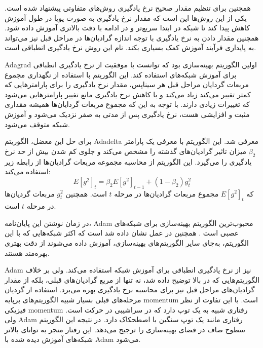 همچنین برای تنظیم مقدار صحیح نرخ یادگیری روش‌های متفاوتی پیشنهاد شده است. یکی از
این روش‌ها این است که مقدار نرخ یادگیری به صورت پویا در طول آموزش کاهش پیدا کند
تا شبکه در ابتدا سریع‌تر و در ادامه با دقت بالاتری آموزش داده شود. همچنین مقدار
دادن به نرخ یادگیری با توجه اندازه گرادیان‌ها در مراحل قبل نیز می‌تواند به
پایداری فرآیند آموزش کمک بسیاری بکند. نام این روش نرخ یادگیری انطباقی است.

Adagrad اولین الگوریتم بهینه‌سازی بود که توانست با موفقیت از نرخ یادگیری
انطباقی برای آموزش شبکه‌های استفاده کند. این الگوریتم با استفاده از نگهداری
مجموع مربعات گردایان مراحل قبل هر سیناپس، مقدار نرخ یادگیری را برای پارامترهایی
که کمتر تغییر می‌کند زیاد می‌کند و با کاهش نرخ یادگیری مانع تغییر پارامترهایی
می‌شود که تغییرات زیادی دارند. با توجه به این که مجموع مربعات گردایان‌ها همیشه
مقداری مثبت و افزایشی هست، نرخ یادگیری پس از مدتی به صفر نزدیک می‌شود و آموزش
شبکه متوقف می‌شود.

برای حل این معضل، الگوریتم Adadelta معرفی شد. این الگوریتم با معرفی یک پارامتر
$\beta_2$ میزان تاثیر گرادیان‌های گذشته را مشخص می‌کند و جلوی کم شدن بیش از حد
نرخ یادگیری را می‌گیرد. این الگوریتم از محاسبه مجموعه مربعات گرادیان‌ها از رابطه
زیر استفاده می‌کند:
\begin{equation}
    E[g^2]_t = \beta_2 E[g^2]_{t-1} + (1 - \beta_2)g_t^2
\end{equation}
که $E[g^2]_t$ مجموع مربعات گرادیان‌ها در مرحله $t$ است. همچنین $g_t^2$ مربعات
گردیان‌ها در مرحله $t$ است.

در زمان نوشتن این پایان‌نامه، Adam محبوب‌ترین الگوریتم بهینه‌سازی برای شبکه‌های
عصبی است \cite{kingma2014adam}. همچنین در عمل نشان داده شد است که اکثر شبکه‌هایی
که با این الگوریتم، به‌جای سایر الگوریتم‌های بهینه‌سازی، آموزش داده می‌شوند از
دقت بهتری بهره‌مند هستند.

Adam نیز از نرخ یادگیری انطباقی برای آموزش شبکه استفاده می‌کند. ولی بر خلاف
الگوریتم‌هایی که در بالا توضیح داده شد، نه تنها از مربع گرادیان‌های قبلی، بلکه
از مقدار گرادیان‌های مراحل قبل نیز برای محاسبه نرخ یادگیری بهره می‌برد. استفاده
از گردیان مرحله‌های قبلی بسیار شبیه الگوریتم‌های برپایه \gls{momentum} است. با
این تفاوت از نظر فیزیکی \gls{momentum} رفتاری شبیه به یک توپ دارد که در سراشیبی
در حرکت است. ولی Adam رفتاری مانند یک توپ سنگین با اصطحکاک دارد. در نتیجه این
الگوریتم سطوح صاف در فضای بهینه‌سازی را ترجیح می‌دهد. این رفتار منجر به توانای
بالاتر شبکه‌های آموزش دیده شده با Adam می‌شود.

